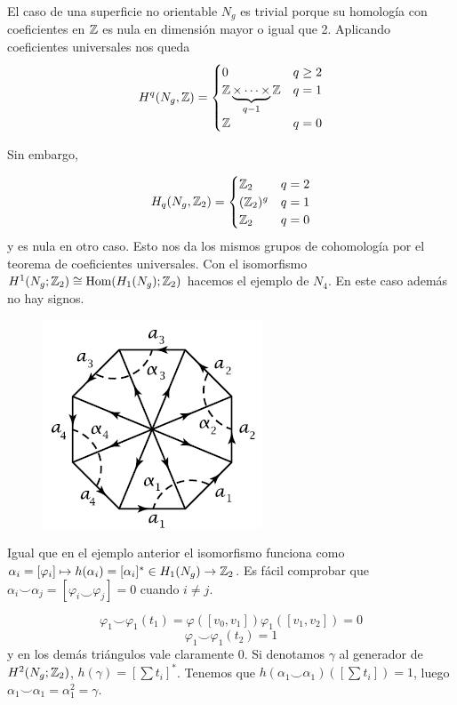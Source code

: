 \documentclass[TA.tex]{subfiles}
\begin{document}
\begin{ej}
El caso de una superficie no orientable $N_g$ es trivial porque su homología con coeficientes en $\mathbb{Z}$ es nula en dimensión mayor o igual que 2. Aplicando coeficientes universales nos queda 
$$H^q(N_g,\mathbb{Z})=\begin{cases}
0 & q\geq 2\\
\mathbb{Z}\underbrace{\times\cdots\times}_{q-1}\mathbb{Z} & q=1\\
\mathbb{Z} & q=0
\end{cases}$$

Sin embargo, 

$$H_q(N_g,\mathbb{Z}_2)=\begin{cases}
\mathbb{Z}_2 & q=2\\
(\mathbb{Z}_2)^g & q=1\\
\mathbb{Z}_2 & q=0
\end{cases}$$
y es nula en otro caso. Esto nos da los mismos grupos de cohomología por el teorema de coeficientes universales. Con el isomorfismo $H^1(N_g;\mathbb{Z}_2)\cong \operatorname{Hom}(H_1(N_g);\mathbb{Z}_2)$ hacemos el ejemplo de $N_4$. En este caso además no hay signos. 

\begin{figure}[h!]
\includegraphics[scale=0.7]{3-8}
\end{figure}

Igual que en el ejemplo anterior el isomorfismo funciona como $\alpha_i=[\varphi_i]\mapsto h(\alpha_i)=[\alpha_i]^*\in H_1(N_g)\to\mathbb{Z}_2$. Es fácil comprobar que $\alpha_i\smile\alpha_j=[\varphi_i\smile\varphi_j]=0$ cuando $i\neq j$. 

$$\varphi_1\smile\varphi_1(t_1)=\varphi([v_0,v_1])\varphi_1([v_1,v_2])=0$$
$$\varphi_1\smile\varphi_1(t_2)=1$$
y en los demás triángulos vale claramente 0. Si denotamos $\gamma$ al generador de $H^2(N_g;\mathbb{Z}_2)$, $h(\gamma)=[\sum t_i]^*$. Tenemos que $h(\alpha_1\smile\alpha_1)([\sum t_i])=1$, luego $\alpha_1\smile\alpha_1=\alpha_1^2=\gamma$. 
\end{ej}
\end{document}
